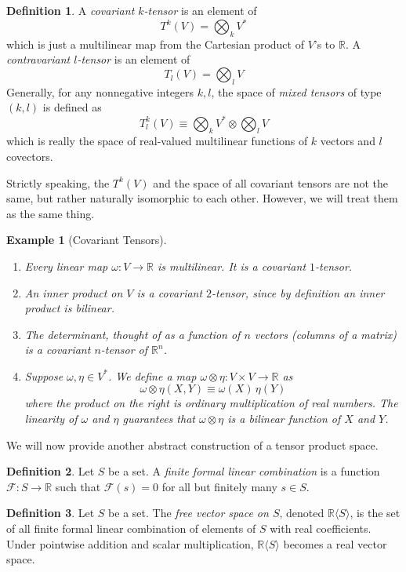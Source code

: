 \documentclass{article}
\newtheorem{example}{Example}[section]
\theoremstyle{remark}
\theoremstyle{definition}
\newtheorem{definition}{Definition}[section]
\begin{document}
\begin{definition}
A \textit{covariant $k$-tensor} is an element of 
\[T^k (V) = \bigotimes_k V^*\]
which is just a multilinear map from the Cartesian product of $V$'s to $\mathbb{R}$. A \textit{contravariant $l$-tensor} is an element of 
\[T_l (V) = \bigotimes_l V\]
Generally, for any nonnegative integers $k, l$, the space of \textit{mixed tensors} of type $(k, l)$ is defined as 
\[T^k_l (V) \equiv \bigotimes_k V^* \otimes \bigotimes_l V\]
which is really the space of real-valued multilinear functions of $k$ vectors and $l$ covectors. 
\end{definition}

Strictly speaking, the $T^k (V)$ and the space of all covariant tensors are not the same, but rather naturally isomorphic to each other. However, we will treat them as the same thing. 

\begin{example}[Covariant Tensors]
\begin{enumerate}
    \item Every linear map $\omega: V \longrightarrow \mathbb{R}$ is multilinear. It is a covariant $1$-tensor. 
    \item An inner product on $V$ is a covariant $2$-tensor, since by definition an inner product is bilinear.  
    \item The determinant, thought of as a function of $n$ vectors (columns of a matrix) is a covariant $n$-tensor of $\mathbb{R}^n$. 
    \item Suppose $\omega, \eta \in V^*$. We define a map $\omega \otimes \eta: V \times V \longrightarrow \mathbb{R}$ as
    \[\omega \otimes \eta (X, Y) \equiv \omega (X) \, \eta(Y)\]
    where the product on the right is ordinary multiplication of real numbers. The linearity of $\omega$ and $\eta$ guarantees that $\omega \otimes \eta$ is a bilinear function of $X$ and $Y$. 
\end{enumerate}
\end{example}

We will now provide another abstract construction of a tensor product space. 

\begin{definition}
Let $S$ be a set. A \textit{finite formal linear combination} is a function $\mathcal{F}: S\longrightarrow \mathbb{R}$ such that $\mathcal{F}(s) = 0$ for all but finitely many $s \in S$. 
\end{definition}

\begin{definition}
Let $S$ be a set. The \textit{free vector space on $S$}, denoted $\mathbb{R} \langle S \rangle$, is the set of all finite formal linear combination of elements of $S$ with real coefficients. Under pointwise addition and scalar multiplication, $\mathbb{R} \langle S \rangle$ becomes a real vector space. 
\end{definition}
\end{document}
